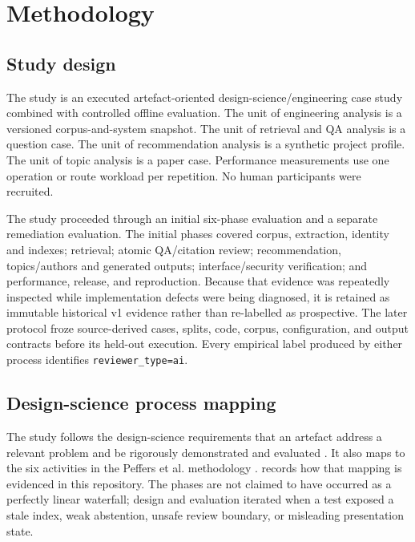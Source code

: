 \chapter{Methodology}
\label{ch:methodology}

\section{Study design}

The study is an executed artefact-oriented design-science/engineering case study combined with controlled offline evaluation. The unit of engineering analysis is a versioned corpus-and-system snapshot. The unit of retrieval and QA analysis is a question case. The unit of recommendation analysis is a synthetic project profile. The unit of topic analysis is a paper case. Performance measurements use one operation or route workload per repetition. No human participants were recruited.

The study proceeded through an initial six-phase evaluation and a separate remediation evaluation. The initial phases covered corpus, extraction, identity and indexes; retrieval; atomic QA/citation review; recommendation, topics/authors and generated outputs; interface/security verification; and performance, release, and reproduction. Because that evidence was repeatedly inspected while implementation defects were being diagnosed, it is retained as immutable historical v1 evidence rather than re-labelled as prospective. The later protocol froze source-derived cases, splits, code, corpus, configuration, and output contracts before its held-out execution. Every empirical label produced by either process identifies \texttt{reviewer\_type=ai}.

\section{Design-science process mapping}

The study follows the design-science requirements that an artefact address a relevant problem and be rigorously demonstrated and evaluated \cite{hevner2004designscience}. It also maps to the six activities in the Peffers et al. methodology \cite{peffers2007dsrm}.  records how that mapping is evidenced in this repository. The phases are not claimed to have occurred as a perfectly linear waterfall; design and evaluation iterated when a test exposed a stale index, weak abstention, unsafe review boundary, or misleading presentation state.

